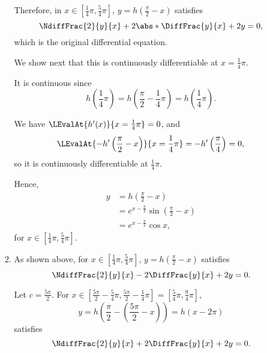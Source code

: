 \begin{enumerate}
\begin{enumerate}
                    Therefore, in \(x \in \left[\frac{1}{4}\pi, \frac{5}{4}\pi\right]\), \(y = h \left(\frac{\pi}{2} - x\right)\) satisfies
                    \[
                        \NdiffFrac{2}{y}{x} + 2 \abs*{\DiffFrac{y}{x}} + 2y = 0,
                    \]
                    which is the original differential equation.


                    We show next that this is continuously differentiable at \(x = \frac{1}{4}\pi\).

                    It is continuous since
                    \[
                        h\left(\frac{1}{4}\pi\right) = h\left(\frac{\pi}{2} - \frac{1}{4}\pi\right) = h \left(\frac{1}{4}\pi\right).
                    \]

                    We have \(\LEvalAt{h'(x)}{x = \frac{1}{4}\pi} = 0\), and
                    \[
                        \LEvalAt{-h'\left(\frac{\pi}{2} - x\right)}{x = \frac{1}{4}\pi} = - h'\left(\frac{\pi}{4}\right) = 0,
                    \]
                    so it is continuously differentiable at \(\frac{1}{4}\pi\).

                    Hence,
                    \begin{align*}
                        y & = h\left(\frac{\pi}{2} - x\right)                           \\
                          & = e^{x - \frac{\pi}{2}} \sin \left(\frac{\pi}{2} - x\right) \\
                          & = e^{x - \frac{\pi}{2}} \cos x,
                    \end{align*}
                    for \(x \in \left[\frac{1}{4}\pi, \frac{5}{4}\pi\right]\).

              \item As shown above, for \(x \in \left[\frac{1}{4}\pi, \frac{5}{4}\pi\right]\), \(y = h\left(\frac{\pi}{2} - x\right)\) satisfies
                    \[
                        \NdiffFrac{2}{y}{x} - 2 \DiffFrac{y}{x} + 2y = 0.
                    \]

                    Let \(c = \frac{5\pi}{2}\). For \(x \in \left[\frac{5\pi}{2} - \frac{5}{4}\pi, \frac{5\pi}{2} - \frac{1}{4}\pi\right] = \left[\frac{5}{4}\pi, \frac{9}{4}\pi\right]\),
                    \[
                        y = h\left(\frac{\pi}{2} - \left(\frac{5\pi}{2} - x\right)\right) = h(x - 2\pi)
                    \]
                    satisfies
                    \[
                        \NdiffFrac{2}{y}{x} + 2 \DiffFrac{y}{x} + 2y = 0.
                    \]


\end{enumerate}
\end{enumerate}
